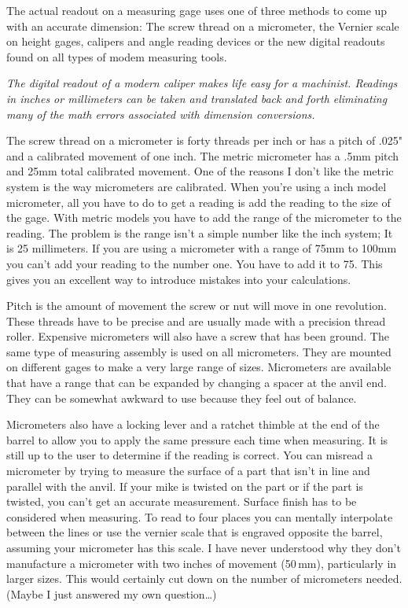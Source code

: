 
The actual readout on a measuring gage uses one of three methods to come up with
an accurate dimension: The screw thread on a micrometer, the Vernier scale on
height gages, calipers and angle reading devices or the new digital readouts
found on all types of modem measuring tools.

\bigskip
\textit{The digital readout of a modern caliper makes life easy for a machinist.
Readings in inches or millimeters can be taken and translated back and forth
eliminating many of the math errors associated with dimension conversions.}
\bigskip

The screw thread on a micrometer is forty threads per inch or has a pitch of
.025" and a calibrated movement of one inch. The metric micrometer has a .5mm
pitch and 25mm total calibrated movement. One of the reasons I don't like the
metric system is the way micrometers are calibrated. When you're using a inch
model micrometer, all you have to do to get a reading is add the reading to the
size of the gage. With metric models you have to add the range of the micrometer
to the reading. The problem is the range isn't a simple number like the inch
system; It is 25 millimeters. If you are using a micrometer with a range of 75mm
to 100mm you can't add your reading to the number one. You have to add it to 75.
This gives you an excellent way to introduce mistakes into your calculations.

Pitch is the amount of movement the screw or nut will move in one revolution.
These threads have to be precise and are usually made with a precision thread
roller. Expensive micrometers will also have a screw that has been
ground. The same type of measuring assembly is used on all micrometers. They are
mounted on different gages to make a very large range of sizes. Micrometers are
available that have a range that can be expanded by changing a spacer at the
anvil end. They can be somewhat awkward to use because they feel out of balance.


Micrometers also have a locking lever and a ratchet thimble at the end of the
barrel to allow you to apply the same pressure each time when measuring. It is
still up to the user to determine if the reading is correct. You can misread a
micrometer by trying to measure the surface of a part that isn't in line and
parallel with the anvil. If your mike is twisted on the part or if the part is
twisted, you can't get an accurate measurement. Surface finish has to be
considered when measuring. To read to four places you can mentally interpolate
between the lines or use the vernier scale that is engraved opposite the barrel,
assuming your micrometer has this scale. I have never understood why they don't
manufacture a micrometer with two inches of movement (50\,mm), particularly in
larger sizes. This would certainly cut down on the number of micrometers needed.
(Maybe I just answered my own question\ldots)

